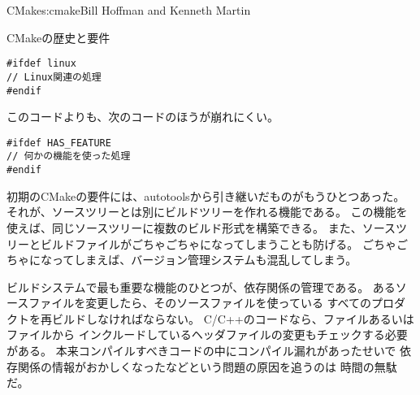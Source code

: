 \begin{aosachapter}{CMake}{s:cmake}{Bill Hoffman and Kenneth Martin}
\begin{aosasect1}{CMakeの歴史と要件}
\begin{verbatim}
#ifdef linux
// Linux関連の処理
#endif
\end{verbatim}

\noindent このコードよりも、次のコードのほうが崩れにくい。

\begin{verbatim}
#ifdef HAS_FEATURE
// 何かの機能を使った処理
#endif
\end{verbatim}

初期のCMakeの要件には、autotoolsから引き継いだものがもうひとつあった。
それが、ソースツリーとは別にビルドツリーを作れる機能である。
この機能を使えば、同じソースツリーに複数のビルド形式を構築できる。
また、ソースツリーとビルドファイルがごちゃごちゃになってしまうことも防げる。
ごちゃごちゃになってしまえば、バージョン管理システムも混乱してしまう。

ビルドシステムで最も重要な機能のひとつが、依存関係の管理である。
あるソースファイルを変更したら、そのソースファイルを使っている
すべてのプロダクトを再ビルドしなければならない。
C/C++のコードなら、ファイルあるいはファイルから
インクルードしているヘッダファイルの変更もチェックする必要がある。
本来コンパイルすべきコードの中にコンパイル漏れがあったせいで
依存関係の情報がおかしくなったなどという問題の原因を追うのは
時間の無駄だ。


\end{aosasect1}
\end{aosachapter}

